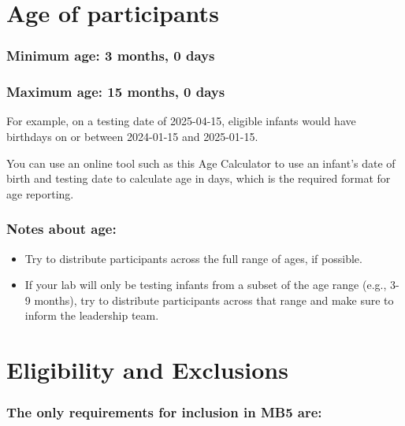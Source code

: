 \documentclass[
  letterpaper,
  DIV=11,
  numbers=noendperiod,
  oneside]{scrreprt}
\providecommand{\tightlist}{%
  \setlength{\itemsep}{0pt}\setlength{\parskip}{0pt}}
\begin{document}
\section{Age of participants}\label{age-of-participants}

\subsubsection{\texorpdfstring{\textbf{Minimum age:} 3 months, 0
days}{Minimum age: 3 months, 0 days}}\label{minimum-age-3-months-0-days}

\subsubsection{\texorpdfstring{\textbf{Maximum age:} 15 months, 0
days}{Maximum age: 15 months, 0 days}}\label{maximum-age-15-months-0-days}

For example, on a testing date of 2025-04-15, eligible infants would
have birthdays on or between 2024-01-15 and 2025-01-15.

You can use an online tool such as this Age Calculator to use an
infant's date of birth and testing date to calculate age in days, which
is the required format for age reporting.

\subsubsection{Notes about age:}\label{notes-about-age}

\begin{itemize}
\tightlist
\item
  Try to distribute participants across the full range of ages, if
  possible.
\item
  If your lab will only be testing infants from a subset of the age
  range (e.g., 3-9 months), try to distribute participants across that
  range and make sure to inform the leadership team.
\end{itemize}

\section{Eligibility and Exclusions}\label{eligibility-and-exclusions}

\subsubsection{\texorpdfstring{The \textbf{only} requirements for
inclusion in MB5
are:}{The only requirements for inclusion in MB5 are:}}\label{the-only-requirements-for-inclusion-in-mb5-are}
\end{document}
